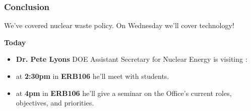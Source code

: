 \begin{frame}[ctb!]
  \frametitle{Conclusion}

  We've covered nuclear waste policy. On Wednesday we'll cover technology!

  \textbf{Today} 
  \begin{itemize}
    \item \textbf{Dr. Pete Lyons} DOE Assistant Secretary for Nuclear Energy is visiting :
    \item at \textbf{2:30pm} in \textbf{ERB106} he'll meet with students.
    \item at \textbf{4pm} in \textbf{ERB106} he'll give a seminar on the Office's current roles, objectives, and priorities.
\end{itemize}
\end{frame}
